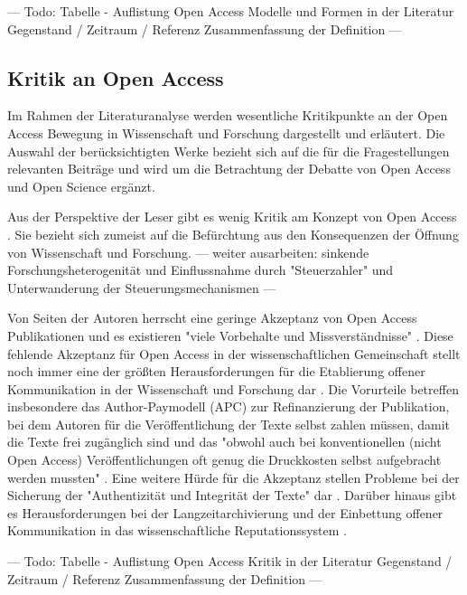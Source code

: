 --- Todo: Tabelle - Auflistung Open Access  Modelle und Formen in der Literatur Gegenstand / Zeitraum / Referenz Zusammenfassung der Definition ---

\subsection{Kritik an Open Access}

Im Rahmen der Literaturanalyse werden wesentliche Kritikpunkte an der Open Access Bewegung in Wissenschaft und Forschung dargestellt und erläutert. Die Auswahl der berücksichtigten Werke bezieht sich auf die für die Fragestellungen relevanten Beiträge und wird um die Betrachtung der Debatte von Open Access und Open Science ergänzt.

Aus der Perspektive der Leser gibt es wenig Kritik am Konzept von Open Access \cite{weishaupt_2009_goldenOA}. Sie bezieht sich zumeist auf die Befürchtung aus den Konsequenzen der Öffnung von Wissenschaft und Forschung.
--- weiter ausarbeiten: sinkende Forschungsheterogenität und Einflussnahme durch "Steuerzahler" und Unterwanderung der Steuerungsmechanismen ---


Von Seiten der Autoren herrscht eine geringe Akzeptanz von Open Access Publikationen und es existieren "viele Vorbehalte und Missverständnisse" \cite{Suber_2002}. Diese fehlende Akzeptanz für Open Access in der wissenschaftlichen Gemeinschaft stellt noch immer eine der größten Herausforderungen für die Etablierung offener Kommunikation in der Wissenschaft und Forschung dar \cite{weishaupt_2009_goldenOA}. Die Vorurteile betreffen insbesondere das Author-Paymodell (APC) zur Refinanzierung der Publikation, bei dem Autoren für die Veröffentlichung der Texte selbst zahlen müssen, damit die Texte frei zugänglich sind \cite{suchen} und das "obwohl auch bei konventionellen (nicht Open Access) Veröffentlichungen oft genug die Druckkosten selbst aufgebracht werden mussten" \cite{weishaupt_2009_goldenOA}. Eine weitere Hürde für die Akzeptanz stellen Probleme bei der Sicherung der "Authentizität und Integrität der Texte" dar \cite{weishaupt_2009_goldenOA}. Darüber hinaus gibt es Herausforderungen bei der Langzeitarchivierung und der Einbettung offener Kommunikation in das wissenschaftliche Reputationssystem \cite{weishaupt_2009_goldenOA} \cite{Suber_2002} \cite{Adema_2014_open_access}.

--- Todo: Tabelle - Auflistung Open Access Kritik in der Literatur
Gegenstand / Zeitraum / Referenz Zusammenfassung der Definition ---

